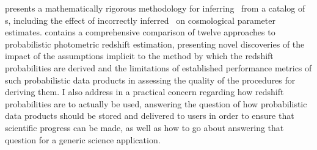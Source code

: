  presents a mathematically rigorous methodology for inferring \Nz\ from a catalog of \pzpdf s, including the effect of incorrectly inferred \Nz\ on cosmological parameter estimates.
 contains a comprehensive comparison of twelve approaches to probabilistic photometric redshift estimation, presenting novel discoveries of the impact of the assumptions implicit to the method by which the redshift probabilities are derived and the limitations of established performance metrics of such probabilistic data products in assessing the quality of the procedures for deriving them.
I also address in  a practical concern regarding how redshift probabilities are to actually be used, answering the question of how probabilistic data products should be stored and delivered to users in order to ensure that scientific progress can be made, as well as how to go about answering that question for a generic science application.


